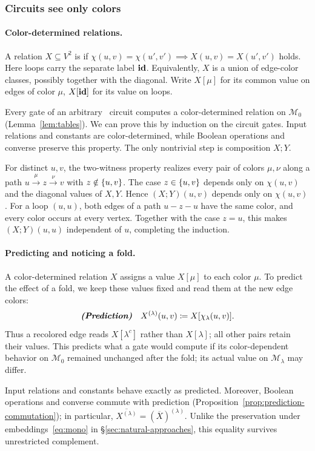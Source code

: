 \subsubsection{Circuits see only colors}\label{ov:types}

\paragraph{Color-determined relations.}
A relation $X\subseteq V^2$ is
 if
$\chi(u,v)=\chi(u',v') \implies X(u,v)=X(u',v')$ holds.
Here loops carry the separate label $\mathbf{id}$.
Equivalently, $X$ is a union of edge-color
classes, possibly together with the diagonal.
Write $X[\mu]$ for its common value on edges
of color $\mu$, $X[\mathbf{id}]$ for its value on
loops.

Every gate of an arbitrary \CoR\ circuit computes a color-determined relation on $\mathcal M_0$ (Lemma~\ref{lem:tables}).
We can prove this by induction on the
circuit gates. Input relations and constants are
color-determined, while Boolean operations and
converse preserve this property.
The only nontrivial step is composition $X;Y$.

For distinct $u,v$, the two-witness property realizes every pair of colors $\mu,\nu$ along a path $u\xrightarrow{\mu}z\xrightarrow{\nu}v$ with $z\notin\{ u,v \}$.
%
The case $z\in\{ u,v \}$ depends only on $\chi(u,v)$ and the diagonal values of $X,Y$.
Hence $(X;Y)(u,v)$ depends only on $\chi(u,v)$.
For a loop $(u,u)$, both edges of a path $u-z-u$ have the same color, and every color occurs at every vertex. 
Together with the case $z=u$, this makes $(X;Y)(u,u)$ independent of $u$, completing the induction.


\paragraph{Predicting and noticing a fold.}
A color-determined relation $X$ assigns a value $X[\mu]$ to each color $\mu$.
To predict the effect of a fold, we keep these values fixed and read them at the new edge colors:
\[
{\boldmath\textbf{\textit{(Prediction)}}}\quad
X^{(\lambda)}(u,v) \coloneqq X[\chi_\lambda(u,v)].
\]
Thus a recolored edge reads $X[\lambda^c]$ rather than $X[\lambda]$; all other pairs retain their values.
%
This predicts what a gate would compute if its color-dependent behavior on $\mathcal M_0$ remained unchanged after the fold;
its actual value on $\mathcal M_\lambda$ may differ.

Input relations and constants behave exactly as predicted.
Moreover, Boolean operations and converse commute with prediction
(Proposition~\ref{prop:prediction-commutation}); in particular,
$\overline{X^{(\lambda)}}=(\overline X)^{(\lambda)}$.
Unlike the preservation under embeddings~\eqref{eq:mono} in \S\ref{sec:natural-approaches},
this equality survives unrestricted complement.

